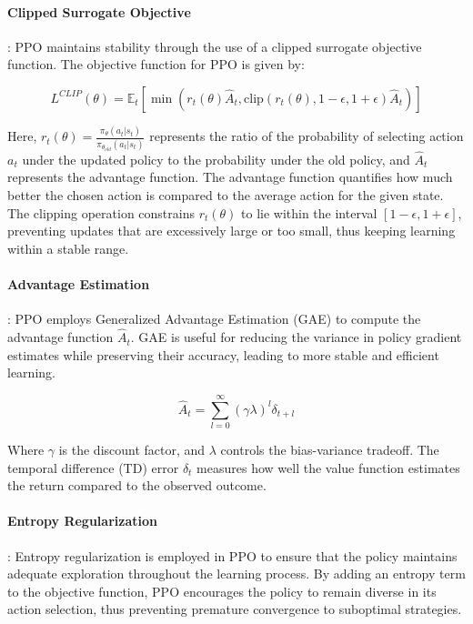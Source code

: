 \documentclass[
12pt, %
oneside, %
english, %
onehalfspacing, %
nolistspacing, %
liststotoc, %
headsepline, %
]{ProposalAndThesis} %
\begin{document}
\paragraph{Clipped Surrogate Objective}: PPO maintains stability through the use of a clipped surrogate objective function. The objective function for PPO is given by:
  
  
  \[ L^{CLIP}(\theta) = \mathbb{E}_t \left[ \min \left( r_t(\theta) \hat{A}_t, \text{clip}(r_t(\theta), 1 - \epsilon, 1 + \epsilon) \hat{A}_t \right) \right] \]

  Here, \( r_t(\theta) = \frac{\pi_\theta(a_t | s_t)}{\pi_{\theta_{old}}(a_t | s_t)} \) represents the ratio of the probability of selecting action \( a_t \) under the updated policy to the probability under the old policy, and \( \hat{A}_t \) represents the advantage function. The advantage function quantifies how much better the chosen action is compared to the average action for the given state. The clipping operation constrains \( r_t(\theta) \) to lie within the interval \([1 - \epsilon, 1 + \epsilon]\), preventing updates that are excessively large or too small, thus keeping learning within a stable range.

\paragraph{Advantage Estimation}: PPO employs Generalized Advantage Estimation (GAE) to compute the advantage function \( \hat{A}_t \). GAE is useful for reducing the variance in policy gradient estimates while preserving their accuracy, leading to more stable and efficient learning.

  
  \[ \hat{A}_t = \sum_{l=0}^\infty (\gamma \lambda)^l \delta_{t+l} \]
  
  Where \( \gamma \) is the discount factor, and \( \lambda \) controls the bias-variance tradeoff. The temporal difference (TD) error \( \delta_t \) measures how well the value function estimates the return compared to the observed outcome.

\paragraph{Entropy Regularization}: Entropy regularization is employed in PPO to ensure that the policy maintains adequate exploration throughout the learning process. By adding an entropy term to the objective function, PPO encourages the policy to remain diverse in its action selection, thus preventing premature convergence to suboptimal strategies.
\end{document}
